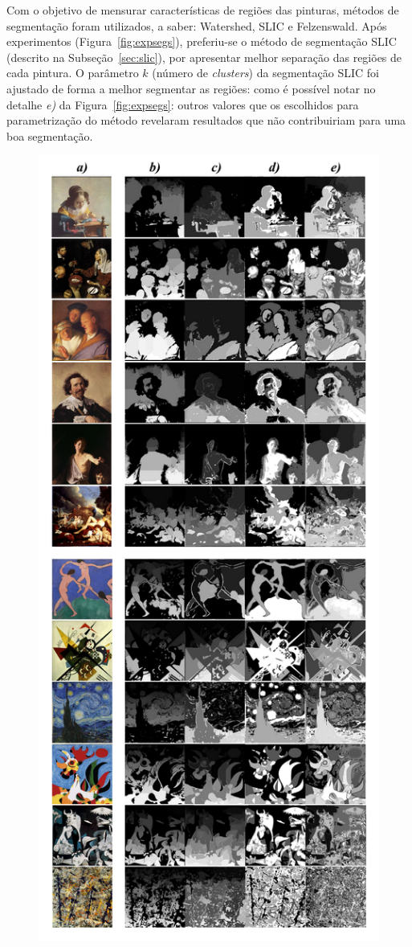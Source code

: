 Com o objetivo de mensurar características de regiões das pinturas, métodos de
segmentação foram utilizados, a saber: Watershed, SLIC e Felzenswald. Após
experimentos (Figura~\ref{fig:expsegs}), preferiu-se o método de segmentação
SLIC (descrito na Subseção~\ref{sec:slic}), por apresentar melhor separação das
regiões de cada pintura. O parâmetro $k$ (número de \textit{clusters}) da
segmentação SLIC foi ajustado de forma a melhor segmentar as regiões: como é
possível notar no detalhe \textit{e)} da Figura~\ref{fig:expsegs}: outros
valores que os escolhidos para parametrização do método revelaram resultados que
não contribuiriam para uma boa segmentação.

\begin{figure}[ht!]
\begin{center}
        \includegraphics[scale=.3]{figs/expsegs}

\end{center}
\end{figure}

